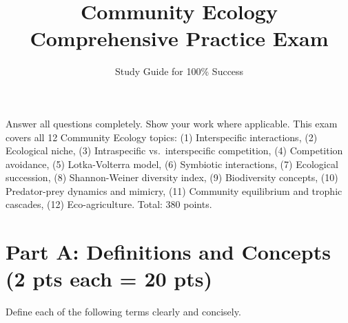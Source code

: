 \documentclass[11pt]{article}
\title{\textbf{Community Ecology Comprehensive Practice Exam}}
\author{Study Guide for 100\% Success}
\date{}
\begin{document}
\maketitle
\thispagestyle{fancy}

\begin{tcolorbox}[colback=blue!5!white,colframe=blue!75!black,title=\textbf{Instructions}]
Answer all questions completely. Show your work where applicable. This exam covers all 12 Community Ecology topics:
(1) Interspecific interactions, (2) Ecological niche, (3) Intraspecific vs.\ interspecific competition,
(4) Competition avoidance, (5) Lotka-Volterra model, (6) Symbiotic interactions,
(7) Ecological succession, (8) Shannon-Weiner diversity index, (9) Biodiversity concepts,
(10) Predator-prey dynamics and mimicry, (11) Community equilibrium and trophic cascades,
(12) Eco-agriculture. Total: 380 points.
\end{tcolorbox}

\vspace{0.4cm}

\section*{Part A: Definitions and Concepts (2 pts each = 20 pts)}
Define each of the following terms clearly and concisely.
\end{document}
